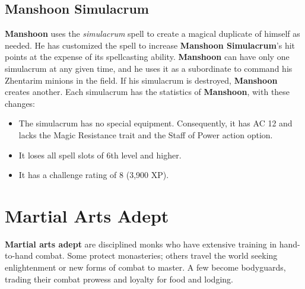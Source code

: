 \documentclass[10pt,a4paper,twoside,twocolumn,openany,nodeprecatedcode]{dndbook}
\begin{document}
\subsection{Manshoon Simulacrum}
\textbf{Manshoon} uses the \textit{simulacrum} spell to create a magical duplicate of himself as needed. He has customized the spell to increase \textbf{Manshoon Simulacrum}'s hit points at the expense of its spellcasting ability.
\textbf{Manshoon} can have only one simulacrum at any given time, and he uses it as a subordinate to command his Zhentarim minions in the field. If his simulacrum is destroyed, \textbf{Manshoon} creates another. Each simulacrum has the statistics of \textbf{Manshoon}, with these changes:
\begin{itemize}

\item The simulacrum has no special equipment. Consequently, it has AC 12 and lacks the Magic Resistance trait and the Staff of Power action option.
\item It loses all spell slots of 6th level and higher.
\item It has a challenge rating of 8 (3,900 XP).
\end{itemize}


\section{Martial Arts Adept}
\textbf{Martial arts adept} are disciplined monks who have extensive training in hand-to-hand combat. Some protect monasteries; others travel the world seeking enlightenment or new forms of combat to master. A few become bodyguards, trading their combat prowess and loyalty for food and lodging.
\end{document}
